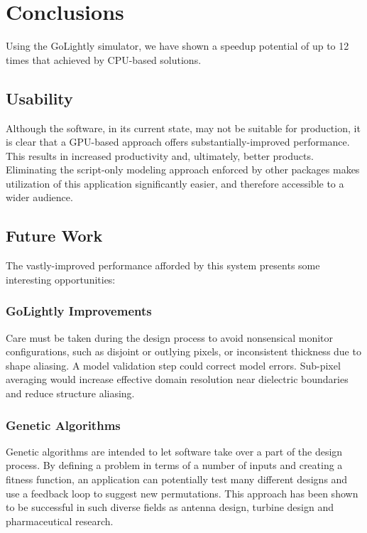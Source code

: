 \chapter{Conclusions} \label{ch:conclusions}

Using the GoLightly simulator, we have shown a speedup potential of up to 12 times that achieved by CPU-based solutions.

\section{Usability}

Although the software, in its current state, may not be suitable for production, it is clear that a GPU-based approach offers substantially-improved performance. This results in increased productivity and, ultimately, better products. Eliminating the script-only modeling approach enforced by other packages makes utilization of this application significantly easier, and therefore accessible to a wider audience.

\section{Future Work}

The vastly-improved performance afforded by this system presents some interesting opportunities:

\subsection{GoLightly Improvements}

Care must be taken during the design process to avoid nonsensical monitor configurations, such as disjoint or outlying pixels, or inconsistent thickness due to shape aliasing. A model validation step could correct model errors. Sub-pixel averaging would increase effective domain resolution near dielectric boundaries and reduce structure aliasing. 

\clearpage

\subsection{Genetic Algorithms}
Genetic algorithms\cite{Mitchell:1998:IGA:522098}\cite{Goldberg:1989:GAS:534133}  are intended to let software take over a part of the design process. By defining a problem in terms of a number of inputs and creating a fitness function, an application can potentially test many different designs and use a feedback loop to suggest new permutations. This approach has been shown to be successful in such diverse fields as antenna design\cite{globus2006automated}, turbine design\cite{MOSETTI1994105} and pharmaceutical research\cite{Chi:2009:MLG:1651932.1652161}. 

